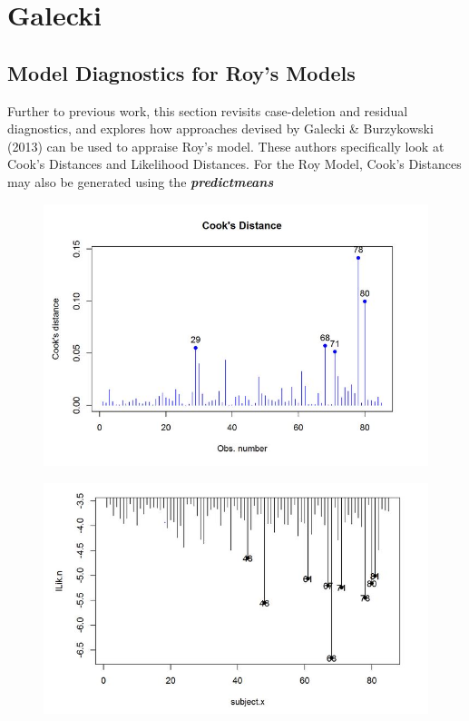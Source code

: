 \documentclass[12pt, a4paper]{report}
\theoremstyle{plain}
\theoremstyle{definition}
\theoremstyle{remark}
\begin{document}
	
	

\chapter{Galecki}
\section{Model Diagnostics for Roy's Models}

Further to previous work, this section revisits case-deletion and residual diagnostics, and explores how approaches devised by  Galecki \& Burzykowski (2013) can be used to appraise Roy's model. These authors specifically look at Cook's Distances and Likelihood Distances.
For the Roy Model, Cook's Distances may also be generated using the \textbf{\textit{predictmeans}}



\begin{figure}[h!]
	\centering
	\includegraphics[width=0.7\linewidth]{images/CooksDistancePlot-JS-Roy}
	\caption{}
	\label{fig:CooksDistancePlot-JS-Roy}
\end{figure}

\begin{figure}[h!]
	\centering
	\includegraphics[width=0.7\linewidth]{images/LogLik-JS-Roy}
	\caption{}
	\label{fig:LogLik-JS-Roy}
\end{figure}
\end{document}
